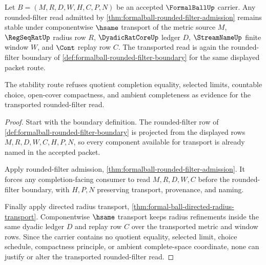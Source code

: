 \begin{theorem}
\label{thm:formalball-rounded-filter-stability}
Let $B=(M,R,D,W,H,C,P,N)$ be an accepted $\FormalBallUp$ carrier. Any rounded-filter read admitted by \autoref{thm:formalball-rounded-filter-admission} remains stable under componentwise $\hsame$ transport of the metric source $M$, $\RegSeqRatUp$ radius row $R$, $\DyadicRatCoreUp$ ledger $D$, $\StreamNameUp$ finite window $W$, and $\Cont$ replay row $C$. The transported read is again the rounded-filter boundary of \autoref{def:formalball-rounded-filter-boundary} for the same displayed packet route.

The stability route refuses quotient completion equality, selected limits, countable choice, open-cover compactness, and ambient completeness as evidence for the transported rounded-filter read.
\end{theorem}
\begin{proof}
Start with the boundary definition. The rounded-filter row of \autoref{def:formalball-rounded-filter-boundary} is projected from the displayed rows $M,R,D,W,C,H,P,N$, so every component available for transport is already named in the accepted packet.

Apply rounded-filter admission, \autoref{thm:formalball-rounded-filter-admission}. It forces any completion-facing consumer to read $M,R,D,W,C$ before the rounded-filter boundary, with $H,P,N$ preserving transport, provenance, and naming.

Finally apply directed radius transport, \autoref{thm:formal-ball-directed-radius-transport}. Componentwise $\hsame$ transport keeps radius refinements inside the same dyadic ledger $D$ and replay row $C$ over the transported metric and window rows. Since the carrier contains no quotient equality, selected limit, choice schedule, compactness principle, or ambient complete-space coordinate, none can justify or alter the transported rounded-filter read.
\end{proof}

